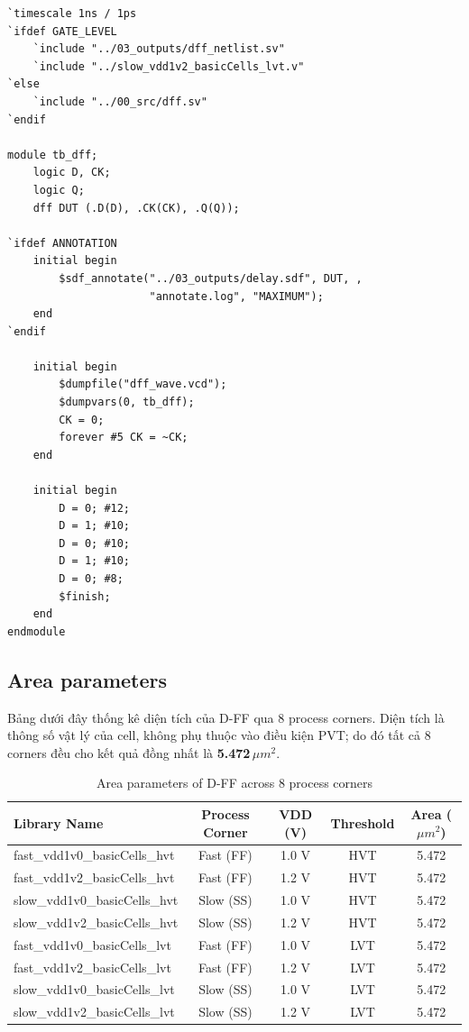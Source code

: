 \documentclass[12pt, a4paper, oneside]{article}
\begin{document}
\begin{lstlisting}[style={prettyverilog}, caption={code testbench D-FF}]
`timescale 1ns / 1ps
`ifdef GATE_LEVEL
    `include "../03_outputs/dff_netlist.sv"
    `include "../slow_vdd1v2_basicCells_lvt.v"
`else
    `include "../00_src/dff.sv"
`endif

module tb_dff;
    logic D, CK;
    logic Q;
    dff DUT (.D(D), .CK(CK), .Q(Q));

`ifdef ANNOTATION
    initial begin
        $sdf_annotate("../03_outputs/delay.sdf", DUT, ,
                      "annotate.log", "MAXIMUM");
    end
`endif

    initial begin
        $dumpfile("dff_wave.vcd");
        $dumpvars(0, tb_dff);
        CK = 0;
        forever #5 CK = ~CK;
    end

    initial begin
        D = 0; #12;
        D = 1; #10;
        D = 0; #10;
        D = 1; #10;
        D = 0; #8;
        $finish;
    end
endmodule
\end{lstlisting}

\subsection{Area parameters}

Bảng dưới đây thống kê diện tích của D-FF qua 8 process corners. Diện tích là
thông số vật lý của cell, không phụ thuộc vào điều kiện PVT; do đó tất cả 8 corners
đều cho kết quả đồng nhất là \textbf{5.472\,$\mu m^2$}.

\begin{table}[H]
    \centering
    \begin{tabular}{|l|c|c|c|c|}
        \hline
        \textbf{Library Name} & \textbf{Process Corner} & \textbf{VDD (V)} & \textbf{Threshold} & \textbf{Area ($\mu m^2$)} \\
        \hline
        fast\_vdd1v0\_basicCells\_hvt & Fast (FF) & 1.0 V & HVT & 5.472 \\ \hline
        fast\_vdd1v2\_basicCells\_hvt & Fast (FF) & 1.2 V & HVT & 5.472 \\ \hline
        slow\_vdd1v0\_basicCells\_hvt & Slow (SS) & 1.0 V & HVT & 5.472 \\ \hline
        slow\_vdd1v2\_basicCells\_hvt & Slow (SS) & 1.2 V & HVT & 5.472 \\ \hline
        fast\_vdd1v0\_basicCells\_lvt & Fast (FF) & 1.0 V & LVT & 5.472 \\ \hline
        fast\_vdd1v2\_basicCells\_lvt & Fast (FF) & 1.2 V & LVT & 5.472 \\ \hline
        slow\_vdd1v0\_basicCells\_lvt & Slow (SS) & 1.0 V & LVT & 5.472 \\ \hline
        slow\_vdd1v2\_basicCells\_lvt & Slow (SS) & 1.2 V & LVT & 5.472 \\ \hline
    \end{tabular}
    \caption{Area parameters of D-FF across 8 process corners}
    \label{tab:exp2_area}
\end{table}
\end{document}
